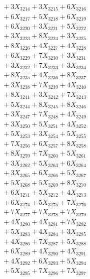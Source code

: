 \documentclass[a4paper,10pt]{article}
\begin{document}
{\begin{align}
&\;  + 3 X_{3214} + 3 X_{3215} + 6 X_{3216} \\[0.3ex]
&\;  + 6 X_{3217} + 5 X_{3218} + 6 X_{3219} \\[0.5ex]\allowbreak
&\;  + 6 X_{3220} + 3 X_{3221} + 5 X_{3222} \\[0.3ex]
&\;  + 3 X_{3223} + 8 X_{3224} + 3 X_{3225} \\[0.3ex]
&\;  + 8 X_{3226} + 4 X_{3227} + 4 X_{3228} \\[0.3ex]
&\;  + 6 X_{3229} + 7 X_{3230} + 3 X_{3231} \\[0.3ex]
&\;  + 3 X_{3232} + 7 X_{3233} + 3 X_{3234} \\[0.3ex]
&\;  + 8 X_{3235} + 4 X_{3236} + 8 X_{3237} \\[0.3ex]
&\;  + 3 X_{3238} + 7 X_{3239} + 4 X_{3240} \\[0.3ex]
&\;  + 8 X_{3241} + 3 X_{3242} + 7 X_{3243} \\[0.3ex]
&\;  + 5 X_{3244} + 8 X_{3245} + 8 X_{3246} \\[0.3ex]
&\;  + 3 X_{3247} + 7 X_{3248} + 4 X_{3249} \\[0.5ex]\allowbreak
&\;  + 3 X_{3250} + 5 X_{3251} + 4 X_{3252} \\[0.3ex]
&\;  + 5 X_{3253} + 3 X_{3254} + 5 X_{3255} \\[0.3ex]
&\;  + 7 X_{3256} + 6 X_{3257} + 8 X_{3258} \\[0.3ex]
&\;  + 8 X_{3259} + 7 X_{3260} + 5 X_{3261} \\[0.3ex]
&\;  + 3 X_{3262} + 5 X_{3263} + 6 X_{3264} \\[0.3ex]
&\;  + 3 X_{3265} + 6 X_{3266} + 5 X_{3267} \\[0.3ex]
&\;  + 5 X_{3268} + 5 X_{3269} + 8 X_{3270} \\[0.3ex]
&\;  + 6 X_{3271} + 5 X_{3272} + 4 X_{3273} \\[0.3ex]
&\;  + 6 X_{3274} + 5 X_{3275} + 7 X_{3276} \\[0.3ex]
&\;  + 7 X_{3277} + 7 X_{3278} + 7 X_{3279} \\[0.5ex]\allowbreak
&\;  + 4 X_{3280} + 4 X_{3281} + 7 X_{3282} \\[0.3ex]
&\;  + 5 X_{3283} + 4 X_{3284} + 3 X_{3285} \\[0.3ex]
&\;  + 4 X_{3286} + 7 X_{3287} + 5 X_{3288} \\[0.3ex]
&\;  + 6 X_{3289} + 4 X_{3290} + 4 X_{3291} \\[0.3ex]
&\;  + 4 X_{3292} + 6 X_{3293} + 5 X_{3294} \\[0.3ex]
&\;  + 5 X_{3295} + 7 X_{3296} + 7 X_{3297} \\[0.3ex]

\end{align}}
\end{document}
